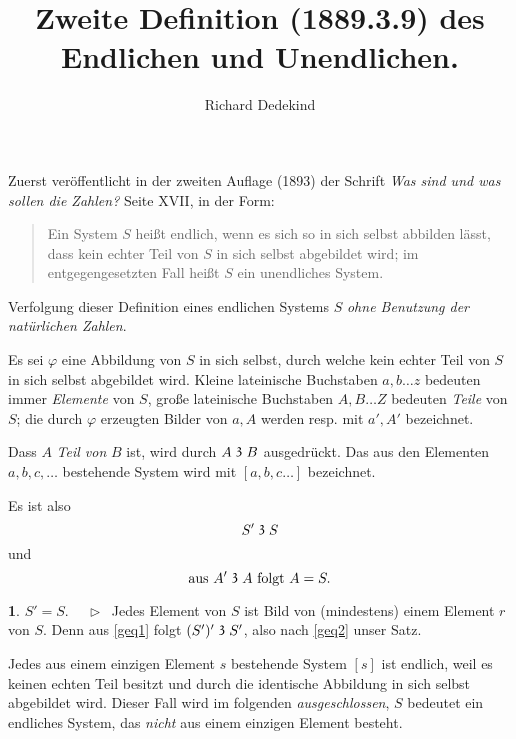 \documentclass[leqno,hidelinks]{article}
\theoremstyle{definition}
\newtheorem{satz}{\protect\satzname}
\newcommand{\satzname}{}
\renewcommand{\satzname}{\hspace{-4pt}.\ Satz}%
\renewcommand{\satzname}{\hspace{-4pt}.\ Theorem}%
\newcommand\Beweis{\medskip \newline $ \phantom{'.'} \rhd \ $}%
\newcommand\TeilVon{\mathrel{\raisebox{0.45ex}{$\mathfrak{3}$}}}
\begin{document}
\hypersetup{pageanchor=false}

\title{Zweite Definition (1889.3.9) des Endlichen und Unendlichen.}
\author{Richard Dedekind}
\date{\phantom{} }
\maketitle

\thispagestyle{empty}

\begin{paracol}{2} %


\noindent Zuerst veröffentlicht in der zweiten Auflage (1893) der Schrift
\textit{\glqq Was sind und was sollen die Zahlen?\grqq{}} Seite XVII, in der Form:%

\begin{quote}
Ein System $S$ heißt endlich, wenn es sich so in sich selbst abbilden
lässt, dass kein echter Teil von $S$ in sich selbst abgebildet
wird; im entgegengesetzten Fall heißt $S$ ein unendliches System.
\end{quote}

Verfolgung dieser Definition eines endlichen Systems $S$
\emph{ohne Benutzung der natürlichen Zahlen}.

Es sei $\varphi$ eine Abbildung von $S$ in sich selbst, durch welche kein echter
Teil von $S$ in sich selbst abgebildet wird.
Kleine lateinische Buchstaben  $a, b \ldots z$ bedeuten immer \emph{Elemente} von
$S$, große lateinische Buchstaben $A, B \ldots Z$ bedeuten \emph{Teile} von $S$;
die durch $\varphi$ erzeugten Bilder von $a, A$ werden resp. mit $a', A'$ bezeichnet.

Dass $A$ \emph{Teil von} $B$ ist, wird durch $A \TeilVon B$ ausgedrückt. Das aus den
Elementen $a, b, c, \ldots $ bestehende System wird mit $[a, b, c \ldots]$ bezeichnet.

Es ist also
\begin{equation}\label{geq1}
				S' \TeilVon S
\end{equation}
und%
\begin{equation}\label{geq2}
		\text{aus } A' \TeilVon A \text{ folgt } A = S.
\end{equation}

\begin{satz}\label{gthm1}$S' = S$.
\Beweis
Jedes Element von $S$ ist Bild von (mindestens) einem Element $r$ von $S$. Denn
aus \eqref{geq1} folgt $(S')' \TeilVon S'$, also nach \eqref{geq2} unser Satz.
\end{satz}
Jedes aus einem einzigen Element $s$ bestehende System $[s]$ ist endlich, weil
es keinen echten Teil besitzt und durch die identische Abbildung in sich selbst
abgebildet wird. Dieser Fall wird im folgenden \emph{ausgeschlossen}, $S$ bedeutet
ein endliches System, das \emph{nicht} aus einem einzigen Element besteht.


\end{paracol}
\end{document}
